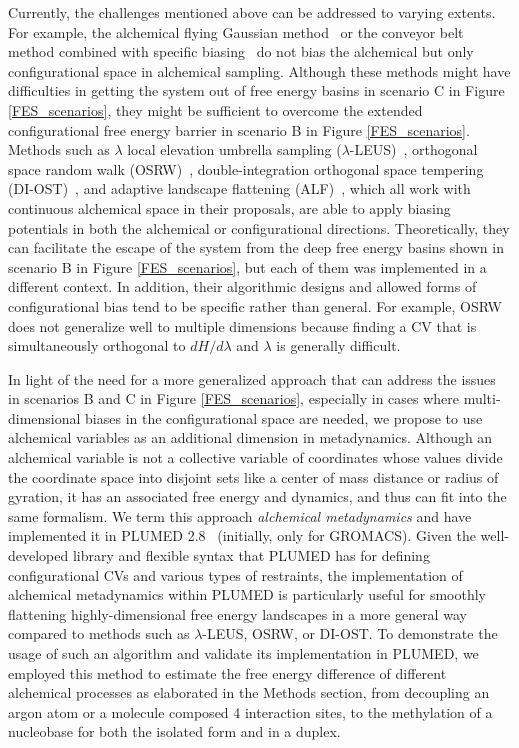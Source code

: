 \documentclass[journal=jacsat,manuscript=article]{achemso}
\begin{document}
Currently, the challenges mentioned above can be addressed to varying extents. For example, the alchemical flying Gaussian method~\cite{trapl2020prediction} or the conveyor belt method combined with specific biasing~\cite{hahn2020overcoming} do not bias the alchemical but only configurational space in alchemical sampling. Although these methods might have difficulties in getting the system out of free energy basins in scenario C in Figure \ref{FES_scenarios}, they might be sufficient to overcome the extended configurational free energy barrier in scenario B in Figure \ref{FES_scenarios}. Methods such as $\lambda$ local elevation umbrella sampling ($\lambda$-LEUS)~\cite{bieler2014local, bieler2015multistate}, orthogonal space random walk (OSRW)~\cite{zheng2008random}, double-integration orthogonal space tempering (DI-OST)~\cite{zheng2012practically}, and adaptive landscape flattening (ALF)~\cite{hayes2017adaptive}, which all work with continuous alchemical space in their proposals, are able to apply biasing potentials in both the alchemical or configurational directions. Theoretically, they can facilitate the escape of the system from the deep free energy basins shown in scenario B in Figure \ref{FES_scenarios}, but each of them was implemented in a different context. In addition, their algorithmic designs and allowed forms of configurational bias tend to be specific rather than general. For example, OSRW does not generalize well to multiple dimensions because finding a CV that is simultaneously orthogonal to $dH/d\lambda$ and $\lambda$ is generally difficult.

In light of the need for a more generalized approach that can address the issues in scenarios B and C in Figure \ref{FES_scenarios}, especially in cases where multi-dimensional biases in the configurational space are needed, we propose to use alchemical variables as an additional dimension in metadynamics. Although an alchemical variable is not a collective variable of coordinates whose values divide the coordinate space into disjoint sets like a center of mass distance or radius of gyration, it has an associated free energy and dynamics, and thus can fit into the same formalism.  We term this approach \textit{alchemical metadynamics} and have implemented it in PLUMED 2.8~\cite{tribello2014plumed} (initially, only for GROMACS). Given the well-developed library and flexible syntax that PLUMED has for defining configurational CVs and various types of restraints, the implementation of alchemical metadynamics within PLUMED is particularly useful for smoothly flattening highly-dimensional free energy landscapes in a more general way compared to methods such as $\lambda$-LEUS, OSRW, or DI-OST. To demonstrate the usage of such an algorithm and validate its implementation in PLUMED, we employed this method to estimate the free energy difference of different alchemical processes as elaborated in the Methods section, from decoupling an argon atom or a molecule composed 4 interaction sites, to the methylation of a nucleobase for both  the isolated form and in a duplex. 
\end{document}
